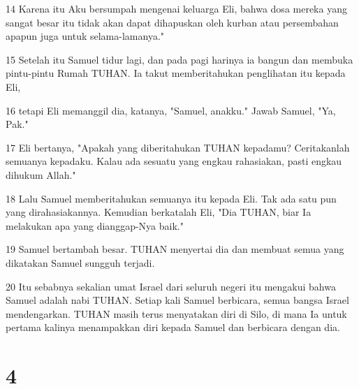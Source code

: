 \par 14 Karena itu Aku bersumpah mengenai keluarga Eli, bahwa dosa mereka yang sangat besar itu tidak akan dapat dihapuskan oleh kurban atau persembahan apapun juga untuk selama-lamanya."
\par 15 Setelah itu Samuel tidur lagi, dan pada pagi harinya ia bangun dan membuka pintu-pintu Rumah TUHAN. Ia takut memberitahukan penglihatan itu kepada Eli,
\par 16 tetapi Eli memanggil dia, katanya, "Samuel, anakku." Jawab Samuel, "Ya, Pak."
\par 17 Eli bertanya, "Apakah yang diberitahukan TUHAN kepadamu? Ceritakanlah semuanya kepadaku. Kalau ada sesuatu yang engkau rahasiakan, pasti engkau dihukum Allah."
\par 18 Lalu Samuel memberitahukan semuanya itu kepada Eli. Tak ada satu pun yang dirahasiakannya. Kemudian berkatalah Eli, "Dia TUHAN, biar Ia melakukan apa yang dianggap-Nya baik."
\par 19 Samuel bertambah besar. TUHAN menyertai dia dan membuat semua yang dikatakan Samuel sungguh terjadi.
\par 20 Itu sebabnya sekalian umat Israel dari seluruh negeri itu mengakui bahwa Samuel adalah nabi TUHAN. Setiap kali Samuel berbicara, semua bangsa Israel mendengarkan. TUHAN masih terus menyatakan diri di Silo, di mana Ia untuk pertama kalinya menampakkan diri kepada Samuel dan berbicara dengan dia.

\chapter{4}

